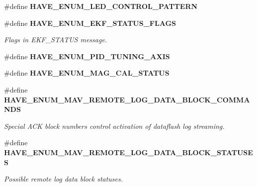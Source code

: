 \begin{DoxyCompactItemize}
\#define \textbf{ H\+A\+V\+E\+\_\+\+E\+N\+U\+M\+\_\+\+L\+E\+D\+\_\+\+C\+O\+N\+T\+R\+O\+L\+\_\+\+P\+A\+T\+T\+E\+RN}
\item 
\#define \textbf{ H\+A\+V\+E\+\_\+\+E\+N\+U\+M\+\_\+\+E\+K\+F\+\_\+\+S\+T\+A\+T\+U\+S\+\_\+\+F\+L\+A\+GS}
\begin{DoxyCompactList}\small\item\em Flags in E\+K\+F\+\_\+\+S\+T\+A\+T\+US message. \end{DoxyCompactList}\item 
\#define \textbf{ H\+A\+V\+E\+\_\+\+E\+N\+U\+M\+\_\+\+P\+I\+D\+\_\+\+T\+U\+N\+I\+N\+G\+\_\+\+A\+X\+IS}
\item 
\#define \textbf{ H\+A\+V\+E\+\_\+\+E\+N\+U\+M\+\_\+\+M\+A\+G\+\_\+\+C\+A\+L\+\_\+\+S\+T\+A\+T\+US}
\item 
\#define \textbf{ H\+A\+V\+E\+\_\+\+E\+N\+U\+M\+\_\+\+M\+A\+V\+\_\+\+R\+E\+M\+O\+T\+E\+\_\+\+L\+O\+G\+\_\+\+D\+A\+T\+A\+\_\+\+B\+L\+O\+C\+K\+\_\+\+C\+O\+M\+M\+A\+N\+DS}
\begin{DoxyCompactList}\small\item\em Special A\+CK block numbers control activation of dataflash log streaming. \end{DoxyCompactList}\item 
\#define \textbf{ H\+A\+V\+E\+\_\+\+E\+N\+U\+M\+\_\+\+M\+A\+V\+\_\+\+R\+E\+M\+O\+T\+E\+\_\+\+L\+O\+G\+\_\+\+D\+A\+T\+A\+\_\+\+B\+L\+O\+C\+K\+\_\+\+S\+T\+A\+T\+U\+S\+ES}
\begin{DoxyCompactList}\small\item\em Possible remote log data block statuses. \end{DoxyCompactList}\end{DoxyCompactItemize}
